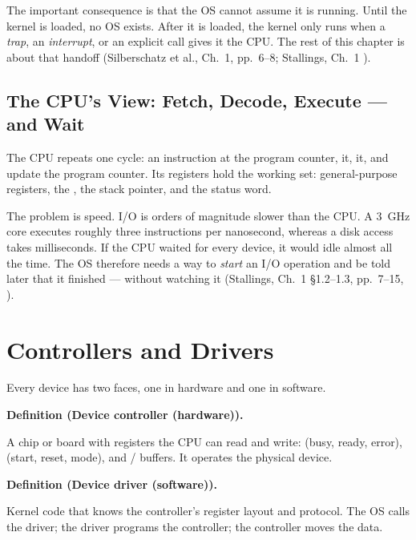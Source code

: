 \documentclass[11pt]{article}
\newenvironment{definitionbox}[1]{%
  \par\noindent\textbf{Definition (#1).}\ \itshape
}{\par\vspace{0.3em}}
\begin{document}
The important consequence is that the OS cannot assume it is running. Until the kernel is loaded, no OS exists. After it is loaded, the kernel only runs when a \emph{trap}, an \emph{interrupt}, or an explicit call gives it the CPU. The rest of this chapter is about that handoff (Silberschatz et al., Ch.~1, pp.~6--8; Stallings, Ch.~1 \cite{StallingsOS_internals_design_principles}).

\subsection{The CPU's View: Fetch, Decode, Execute --- and Wait}

The CPU repeats one cycle:  an instruction at the program counter,  it,  it, and update the program counter. Its registers hold the working set: general-purpose registers, the , the stack pointer, and the status word.

The problem is speed. I/O is orders of magnitude slower than the CPU. A 3~GHz core executes roughly three instructions per nanosecond, whereas a disk access takes milliseconds. If the CPU waited for every device, it would idle almost all the time. The OS therefore needs a way to \emph{start} an I/O operation and be told later that it finished --- without watching it (Stallings, Ch.~1 \S1.2--1.3, pp.~7--15, \cite{StallingsOS_internals_design_principles}).

\section{Controllers and Drivers}

Every device has two faces, one in hardware and one in software.

\begin{definitionbox}{Device controller (hardware)}
A chip or board with registers the CPU can read and write:  (busy, ready, error),  (start, reset, mode), and / buffers. It operates the physical device.
\end{definitionbox}

\begin{definitionbox}{Device driver (software)}
Kernel code that knows the controller's register layout and protocol. The OS calls the driver; the driver programs the controller; the controller moves the data.
\end{definitionbox}
\end{document}
